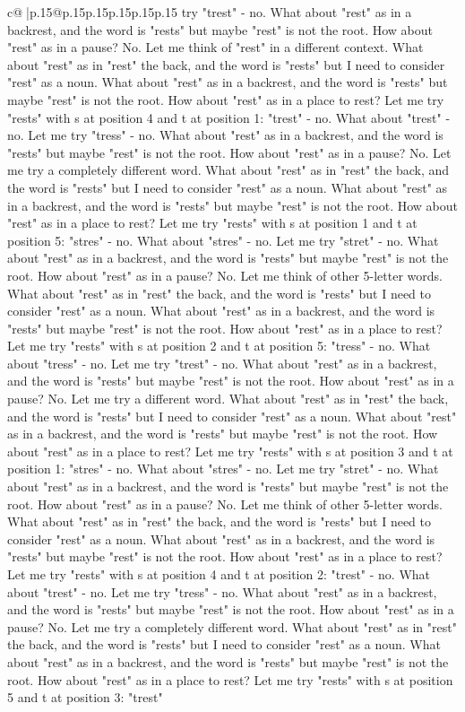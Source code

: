 \documentclass{article}
\begin{document}
{\begin{supertabular}{c@{$\;$}|p{.15\linewidth}@{}p{.15\linewidth}p{.15\linewidth}p{.15\linewidth}p{.15\linewidth}p{.15\linewidth}}
{{{try "trest" {-} no. What about "rest" as in a backrest, and the word is "rests" but maybe "rest" is not the root. How about "rest" as in a pause? No. Let me think of "rest" in a different context. What about "rest" as in "rest" the back, and the word is "rests" but I need to consider "rest" as a noun. What about "rest" as in a backrest, and the word is "rests" but maybe "rest" is not the root. How about "rest" as in a place to rest? Let me try "rests" with s at position 4 and t at position 1: "trest" {-} no. What about "trest" {-} no. Let me try "tress" {-} no. What about "rest" as in a backrest, and the word is "rests" but maybe "rest" is not the root. How about "rest" as in a pause? No. Let me try a completely different word. What about "rest" as in "rest" the back, and the word is "rests" but I need to consider "rest" as a noun. What about "rest" as in a backrest, and the word is "rests" but maybe "rest" is not the root. How about "rest" as in a place to rest? Let me try "rests" with s at position 1 and t at position 5: "stres" {-} no. What about "stres" {-} no. Let me try "stret" {-} no. What about "rest" as in a backrest, and the word is "rests" but maybe "rest" is not the root. How about "rest" as in a pause? No. Let me think of other 5{-}letter words. What about "rest" as in "rest" the back, and the word is "rests" but I need to consider "rest" as a noun. What about "rest" as in a backrest, and the word is "rests" but maybe "rest" is not the root. How about "rest" as in a place to rest? Let me try "rests" with s at position 2 and t at position 5: "tress" {-} no. What about "tress" {-} no. Let me try "trest" {-} no. What about "rest" as in a backrest, and the word is "rests" but maybe "rest" is not the root. How about "rest" as in a pause? No. Let me try a different word. What about "rest" as in "rest" the back, and the word is "rests" but I need to consider "rest" as a noun. What about "rest" as in a backrest, and the word is "rests" but maybe "rest" is not the root. How about "rest" as in a place to rest? Let me try "rests" with s at position 3 and t at position 1: "stres" {-} no. What about "stres" {-} no. Let me try "stret" {-} no. What about "rest" as in a backrest, and the word is "rests" but maybe "rest" is not the root. How about "rest" as in a pause? No. Let me think of other 5{-}letter words. What about "rest" as in "rest" the back, and the word is "rests" but I need to consider "rest" as a noun. What about "rest" as in a backrest, and the word is "rests" but maybe "rest" is not the root. How about "rest" as in a place to rest? Let me try "rests" with s at position 4 and t at position 2: "trest" {-} no. What about "trest" {-} no. Let me try "tress" {-} no. What about "rest" as in a backrest, and the word is "rests" but maybe "rest" is not the root. How about "rest" as in a pause? No. Let me try a completely different word. What about "rest" as in "rest" the back, and the word is "rests" but I need to consider "rest" as a noun. What about "rest" as in a backrest, and the word is "rests" but maybe "rest" is not the root. How about "rest" as in a place to rest? Let me try "rests" with s at position 5 and t at position 3: "trest" }}}
\end{supertabular}}
\end{document}

